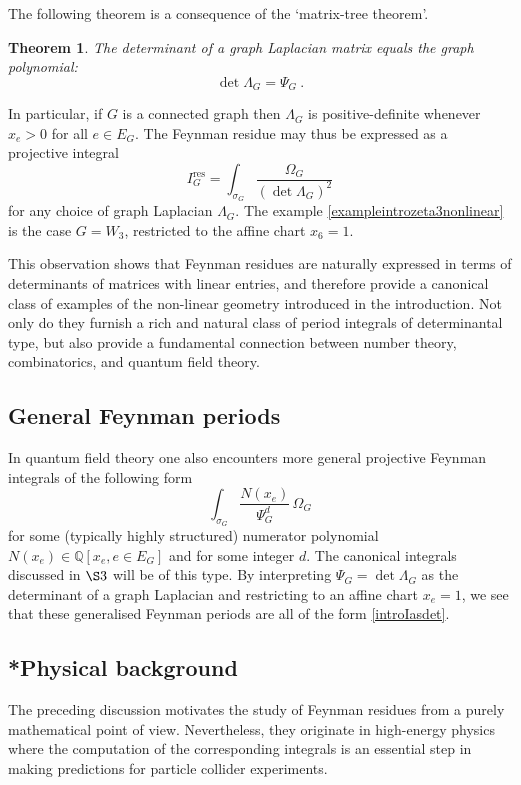 \documentclass[12pt]{amsart}
\newcommand{\QQ}{{\mathbb Q}}
\newcommand{\res}{\mathrm{res}}
\theoremstyle{plain}
\newtheorem{thm}{Theorem}
\newcommand{\0}{\color{blue}{\mathsf{0}}}
\begin{document}
The following theorem is a consequence of the `matrix-tree theorem'.
\begin{thm} The determinant  of a graph Laplacian matrix equals the graph polynomial:
\[ \det \Lambda_G = \Psi_G\ .\]
\end{thm} 
In particular, if $G$ is a connected graph then $\Lambda_G$ is positive-definite whenever $x_e>0$ for all $e\in E_G.$
The Feynman residue may  thus be expressed as a projective integral
\begin{equation} I^{\res}_G = \int_{\sigma_G}  \frac{\Omega_G}{ (\det \Lambda_G)^2} \end{equation}
for any choice of graph Laplacian $\Lambda_G$. The example \ref{exampleintrozeta3nonlinear} is the case  $G=W_3$, restricted to the affine chart $x_6=1.$


This observation shows that Feynman residues are naturally expressed in terms of determinants of matrices with linear entries, and therefore provide a canonical class of examples of the non-linear geometry introduced in the introduction. Not only do they furnish a rich and natural class of period integrals of determinantal type, but also provide a fundamental connection between number theory, combinatorics, and quantum field theory.



\subsection{General Feynman periods}
In quantum field theory one also encounters more general projective Feynman integrals of the following form
\begin{equation} \label{GeneralIG}  \int_{\sigma_G}  \frac{ N(x_e)}{\Psi_G^d}\, \Omega_G\end{equation}
for some (typically  highly structured)  numerator polynomial  $N(x_e) \in \QQ[x_e, e\in E_G] $ and for some integer $d$. The canonical integrals discussed in $\S 3$ will be  of this type. By interpreting $\Psi_G=\det \Lambda_G$  as the determinant of a graph Laplacian and restricting to an affine chart $x_e=1$, we see that  these generalised Feynman periods are all of the form \eqref{introIasdet}.



\subsection{*Physical background}  \label{sect:physics} The preceding discussion motivates the study of Feynman residues from a purely mathematical point of view.  Nevertheless, they originate  in high-energy physics where the computation of the corresponding integrals is an essential step in making predictions for particle collider experiments. 
\end{document}

